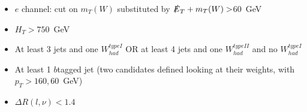 \documentclass[xcolor=dvipsnames,10pt]{beamer}
\begin{document}
\begin{frame}
\begin{minipage}{.6\textwidth}
\scriptsize
\begin{itemize}
\item $e$ channel: cut on $m_T(W)$ substituted by $\slashed{E}_T + m_T(W)>$60~GeV
\item $H_T>750$~GeV
\item At least 3 jets and one $W^{type I}_{had}$ OR at least 4 jets and one $W^{type II}_{had}$ and no $W^{type I}_{had}$
\item At least 1 $b$tagged jet (\alert{two candidates} defined looking at their weights, with $p_T>160, 60$~GeV)
\item \alert{$\Delta R(l,\nu) < 1.4$}
\end{itemize}

\end{minipage}


\end{frame}
\end{document}
